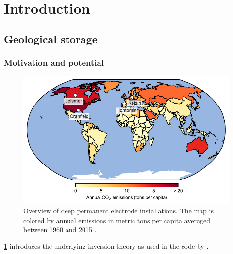 \chapter{Introduction}\label{chap:theory}
\minitoc
\vfill
{}

\section{Geological \co storage}

\subsection{Motivation and potential}
\citep{Archie1942} 
\Blindtext



\begin{figure}[htbp]
\centering
\includegraphics[width=.9\textwidth]{figs/map.pdf}
\caption{Overview of deep permanent electrode installations. The map is colored by annual \co emissions in metric tons per capita averaged between 1960 and 2015 \citep{Bank2015}.}
\label{fig:map}
\end{figure}
%

\cref{chap:theory} introduces the underlying inversion theory as used in the code by \cite{Ruecker2017}.
